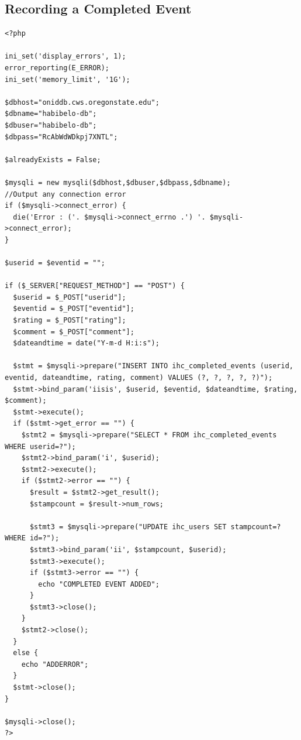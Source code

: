 \documentclass[onecolumn, draftclsnofoot,10pt, compsoc]{IEEEtran}
\begin{document}
  \subsection{Recording a Completed Event}
    \begin{lstlisting}[style=php]
<?php

ini_set('display_errors', 1);
error_reporting(E_ERROR);
ini_set('memory_limit', '1G');

$dbhost="oniddb.cws.oregonstate.edu";
$dbname="habibelo-db";
$dbuser="habibelo-db";
$dbpass="RcAbWdWDkpj7XNTL";

$alreadyExists = False;

$mysqli = new mysqli($dbhost,$dbuser,$dbpass,$dbname);
//Output any connection error
if ($mysqli->connect_error) {
  die('Error : ('. $mysqli->connect_errno .') '. $mysqli->connect_error);
}

$userid = $eventid = "";

if ($_SERVER["REQUEST_METHOD"] == "POST") {
  $userid = $_POST["userid"];
  $eventid = $_POST["eventid"];
  $rating = $_POST["rating"];
  $comment = $_POST["comment"];
  $dateandtime = date("Y-m-d H:i:s");

  $stmt = $mysqli->prepare("INSERT INTO ihc_completed_events (userid, eventid, dateandtime, rating, comment) VALUES (?, ?, ?, ?, ?)");
  $stmt->bind_param('iisis', $userid, $eventid, $dateandtime, $rating, $comment);
  $stmt->execute();
  if ($stmt->get_error == "") {
    $stmt2 = $mysqli->prepare("SELECT * FROM ihc_completed_events WHERE userid=?");
    $stmt2->bind_param('i', $userid);
    $stmt2->execute();
    if ($stmt2->error == "") {
      $result = $stmt2->get_result();
      $stampcount = $result->num_rows;

      $stmt3 = $mysqli->prepare("UPDATE ihc_users SET stampcount=? WHERE id=?");
      $stmt3->bind_param('ii', $stampcount, $userid);
      $stmt3->execute();
      if ($stmt3->error == "") {
        echo "COMPLETED EVENT ADDED";
      }
      $stmt3->close();
    }
    $stmt2->close();
  }
  else {
    echo "ADDERROR";
  }
  $stmt->close();
}

$mysqli->close();
?>
    \end{lstlisting}
    \newpage
\end{document}
